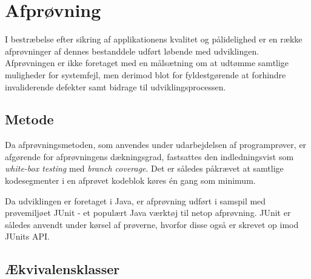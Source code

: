 	\section{Afprøvning}
	\label{sec:afproevning}
	I bestræbelse efter sikring af applikationens kvalitet og pålidelighed er en række afprøvninger af dennes bestanddele udført løbende med udviklingen. Afprøvningen er ikke foretaget med en målsætning om at udtømme samtlige muligheder for systemfejl, men derimod blot for fyldestgørende at forhindre invaliderende defekter samt bidrage til udviklingsprocessen.

	\subsection{Metode}
	\label{subsec:metode}
	Da afprøvningsmetoden, som anvendes under udarbejdelsen af programprøver, er afgørende for afprøvningens dækningsgrad, fastsattes den indledningsvist som \emph{white-box testing} med \emph{branch coverage}. Det er således påkrævet at samtlige kodesegmenter i en afprøvet kodeblok køres én gang som minimum.
	
	Da udviklingen er foretaget i Java, er afprøvning udført i samspil med prøvemiljøet JUnit - et populært Java værktøj til netop afprøvning. JUnit er således anvendt under kørsel af prøverne, hvorfor disse også er skrevet op imod JUnits API.

	\subsection{Ækvivalensklasser}
	\label{subsec:aekvivalensklasser}
